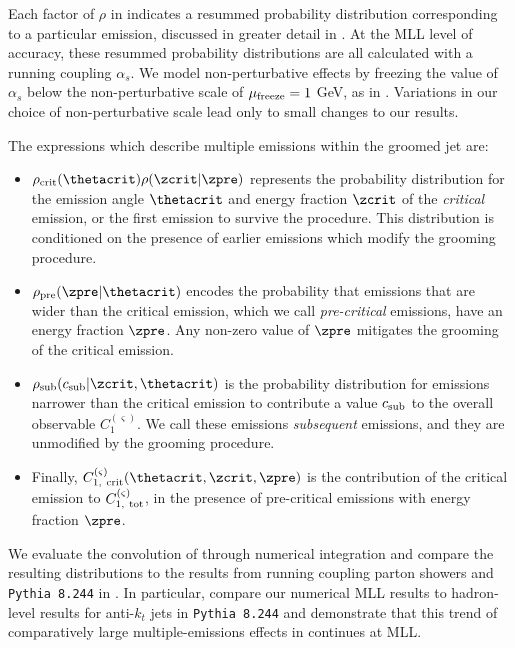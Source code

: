 \documentclass[letterpaper,11pt]{article}
\begin{document}
Each factor of \(\rho\) in  indicates a resummed probability distribution corresponding to a particular emission, discussed in greater detail in .
%
At the MLL level of accuracy, these resummed probability distributions are all calculated with a running coupling \(\alpha_s\).
%
We model non-perturbative effects by freezing the value of \(\alpha_s\) below the non-perturbative scale of \(\mu_{\rm freeze} = 1\) GeV, as in .
%
Variations in our choice of non-perturbative scale lead only to small changes to our results.


The expressions which describe multiple emissions within the groomed jet are:
\begin{itemize}
\item
\(\rho_{\rm crit}(\thetacrit) \rho(\zcrit | \zpre)\) represents the probability distribution for the emission angle \(\thetacrit\) and energy fraction \(\zcrit\) of the \textit{critical} emission, or the first emission to survive the  procedure.
%
This distribution is conditioned on the presence of earlier emissions which modify the grooming procedure.

\item
\(\rho_{\rm pre}(\zpre | \thetacrit)\) encodes the probability that emissions that are wider than the critical emission, which we call \textit{pre-critical} emissions, have an energy fraction \(\zpre\).
%
%
Any non-zero value of \(\zpre\) mitigates the grooming of the critical emission.

\item
\(\rho_{\rm sub}(c_{\rm sub} | \zcrit, \thetacrit)\) is the probability distribution for emissions narrower than the critical emission to contribute a value \(c_{\rm sub}\) to the overall observable \(C^{(\varsigma)}_1\).
%
We call these emissions \textit{subsequent} emissions, and they are unmodified by the grooming procedure.

\item
Finally, \(C^{(\varsigma)}_{1,~\rm crit}(\thetacrit,\zcrit,\zpre)\) is the contribution of the critical emission to \(C^{(\varsigma)}_{1,~\rm tot}\), in the presence of pre-critical emissions with energy fraction \(\zpre\).
\end{itemize}

We evaluate the convolution of  through numerical integration and compare the resulting distributions to the results from running coupling parton showers and \texttt{Pythia 8.244} in .
%
In particular,  compare our numerical MLL results to hadron-level results for anti-\(k_t\) jets in \texttt{Pythia 8.244} and demonstrate that this trend of comparatively large multiple-emissions effects in  continues at MLL.
\end{document}
